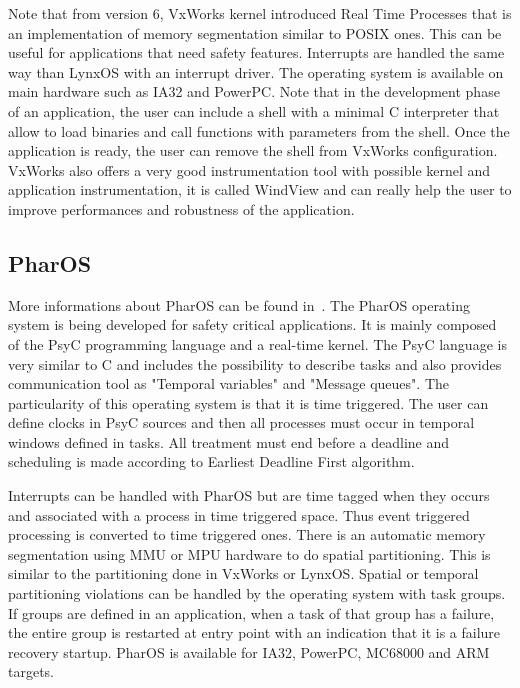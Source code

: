 \documentclass[10pt]{report}
\begin{document}
Note that from version 6, VxWorks kernel introduced Real Time Processes that is an implementation of memory segmentation
similar to POSIX ones. This can be useful for applications that need safety features. Interrupts are handled the same way
than LynxOS with an interrupt driver. The operating system is available on main hardware such as IA32 and PowerPC. Note that
in the development phase of an application, the user can include a shell with a minimal C interpreter that allow to load
binaries and call functions with parameters from the shell. Once the application is ready, the user can remove the shell from
VxWorks configuration. VxWorks also offers a very good instrumentation tool with possible kernel and application instrumentation,
it is called WindView and can really help the user to improve performances and robustness of the application.

\subsection{PharOS}

More informations about PharOS can be found in~\cite{OASIS:98}. The PharOS operating system is being developed for safety critical
applications. It is mainly composed of the PsyC programming language and a real-time kernel. The PsyC language is very similar to C and
includes the possibility to describe tasks and also provides communication tool as "Temporal variables" and "Message queues".
The particularity of this operating system is that it is time triggered. The user can define clocks in PsyC sources and then all
processes must occur in temporal windows defined in tasks. All treatment must end before a deadline and scheduling is made according
to Earliest Deadline First algorithm.

Interrupts can be handled with PharOS but are time tagged when they occurs and associated with a process in time triggered
space. Thus event triggered processing is converted to time triggered ones. There is an automatic memory segmentation using MMU
or MPU hardware to do spatial partitioning. This is similar to the partitioning done in VxWorks or LynxOS. Spatial or temporal
partitioning violations can be handled by the operating system with task groups. If groups are defined in an application, when
a task of that group has a failure, the entire group is restarted at entry point with an indication that it is a failure
recovery startup. PharOS is available for IA32, PowerPC, MC68000 and ARM targets.
\end{document}
